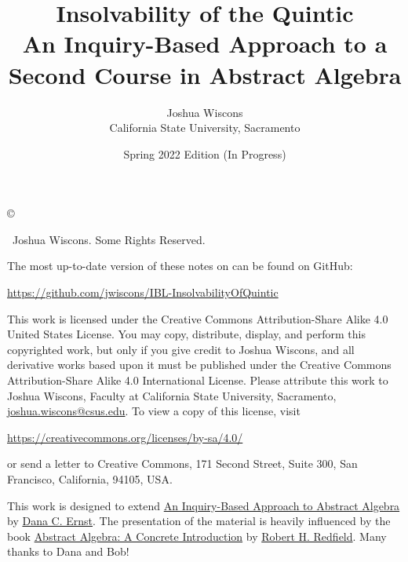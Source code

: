 \documentclass[12pt,oneside]{book}
\theoremstyle{definition}
\begin{document}
\title{Insolvability of the Quintic\\ {\normalsize \normalfont  An Inquiry-Based Approach to a Second Course in Abstract Algebra}}
\author{Joshua Wiscons\\
California State University, Sacramento}
\date{Spring 2022 Edition (In Progress)}

\maketitle

\noindent\copyright{ \the\year\ Joshua Wiscons.  Some Rights Reserved.\\

\bigskip

\noindent The most up-to-date version of these notes on can be found on GitHub:
\begin{center}
\url{https://github.com/jwiscons/IBL-InsolvabilityOfQuintic}
\end{center}

\medskip

\noindent This work is licensed under the Creative Commons Attribution-Share Alike 4.0 United States License.  You may copy, distribute, display, and perform this copyrighted work, but only if you give credit to Joshua Wiscons, and all derivative works based upon it must be published under the Creative Commons Attribution-Share Alike 4.0 International License. Please attribute this work to Joshua Wiscons, Faculty at California State University, Sacramento, \url{joshua.wiscons@csus.edu}. To view a copy of this license, visit
\begin{center}
\url{https://creativecommons.org/licenses/by-sa/4.0/}
\end{center}
or send a letter to Creative Commons, 171 Second Street, Suite 300, San Francisco, California, 94105, USA.}

\medskip

\begin{center}
\ccbysa
\end{center}

\medskip

\noindent This work is designed to extend \href{https://github.com/dcernst/IBL-AbstractAlgebra}{An Inquiry-Based Approach to Abstract Algebra} by \href{http://danaernst.com}{Dana C. Ernst}. The presentation of the material is heavily influenced by the book \href{https://www.amazon.com/Abstract-Algebra-Introduction-Robert-Redfield/dp/020143721X}{Abstract Algebra: A Concrete Introduction} by \href{https://www.hamilton.edu/academics/our-faculty/directory/faculty-detail/robert-redfield}{Robert H. Redfield}. Many thanks to  Dana and Bob! 
\end{document}
